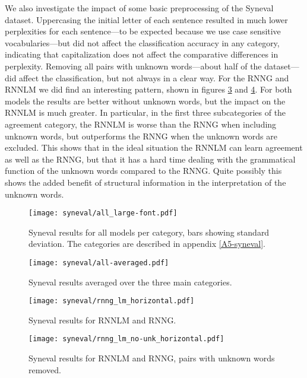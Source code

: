     We also investigate the impact of some basic preprocessing of the Syneval dataset. Uppercasing the initial letter of each sentence resulted in much lower perplexities for each sentence---to be expected because we use case sensitive vocabularies---but did not affect the classification accuracy in any category, indicating that capitalization does not affect the comparative differences in perplexity. Removing all pairs with unknown words---about half of the dataset---did affect the classification, but not always in a clear way. For the RNNG and RNNLM we did find an interesting pattern, shown in figures \ref{fig:syneval-lm-rnng} and \ref{fig:syneval-lm-rnng-nounk}. For both models the results are better without unknown words, but the impact on the RNNLM is much greater. In particular, in the first three subcategories of the agreement category, the RNNLM is worse than the RNNG when including unknown words, but outperforms the RNNG when the unknown words are excluded. This shows that in the ideal situation the RNNLM can learn agreement as well as the RNNG, but that it has a hard time dealing with the grammatical function of the unknown words compared to the RNNG. Quite possibly this shows the added benefit of structural information in the interpretation of the unknown words.

      \begin{figure}[h]
        \center
        \texttt{[image: syneval/all\_large-font.pdf]}
      \caption{Syneval results for all models per category, bars showing standard deviation. The categories are described in appendix \ref{A5-syneval}.}
      \label{fig:syneval-all}
      \end{figure}
    \restoregeometry

    \begin{figure}[h]
      \center
      \texttt{[image: syneval/all-averaged.pdf]}
    \caption{Syneval results averaged over the three main categories.}
    \label{fig:syneval-all-averaged}
    \end{figure}

    \begin{figure}[h]
      \center
      \texttt{[image: syneval/rnng\_lm\_horizontal.pdf]}
    \caption{Syneval results for RNNLM and RNNG.}
    \label{fig:syneval-lm-rnng}
    \end{figure}

    \begin{figure}[h]
      \center
      \texttt{[image: syneval/rnng\_lm\_no-unk\_horizontal.pdf]}
    \caption{Syneval results for RNNLM and RNNG, pairs with unknown words removed.}
    \label{fig:syneval-lm-rnng-nounk}
    \end{figure}
